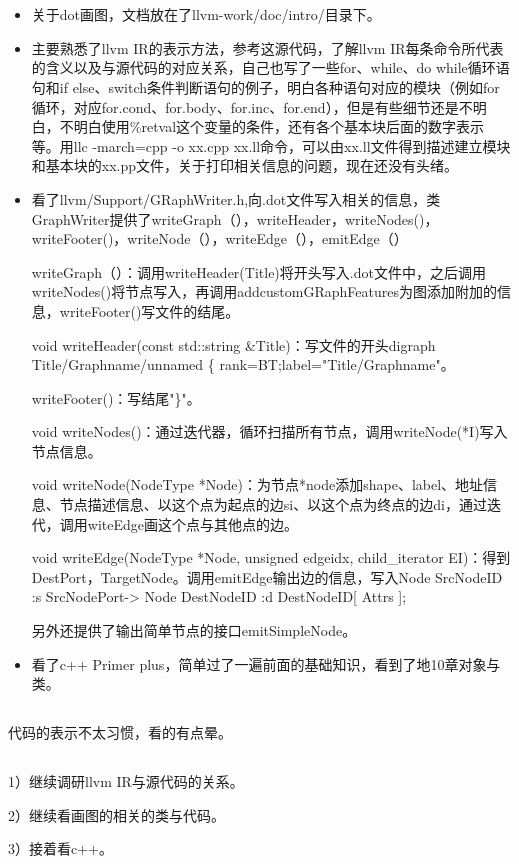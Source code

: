\section{}

\subsection{}

\begin{itemize}

\item{关于dot画图，文档放在了llvm-work/doc/intro/目录下。}

\item{主要熟悉了llvm IR的表示方法，参考这源代码，了解llvm IR每条命令所代表的含义以及与源代码的对应关系，自己也写了一些for、while、do while循环语句和if else、switch条件判断语句的例子，明白各种语句对应的模块（例如for循环，对应for.cond、for.body、for.inc、for.end），但是有些细节还是不明白，不明白使用\%retval这个变量的条件，还有各个基本块后面的数字表示等。用llc -march=cpp -o xx.cpp xx.ll命令，可以由xx.ll文件得到描述建立模块和基本块的xx.pp文件，关于打印相关信息的问题，现在还没有头绪。}

\item{看了llvm/Support/GRaphWriter.h,向.dot文件写入相关的信息，类GraphWriter提供了writeGraph（），writeHeader，writeNodes()，writeFooter()，writeNode（），writeEdge（），emitEdge（）

writeGraph（）：调用writeHeader(Title)将开头写入.dot文件中，之后调用writeNodes()将节点写入，再调用addcustomGRaphFeatures为图添加附加的信息，writeFooter()写文件的结尾。

void writeHeader(const std::string \&Title)：写文件的开头digraph Title/Graphname/unnamed \{ rank=BT;label="Title/Graphname"。

writeFooter()：写结尾"\}"。

void writeNodes()：通过迭代器，循环扫描所有节点，调用writeNode(*I)写入节点信息。

void writeNode(NodeType *Node)：为节点*node添加shape、label、地址信息、节点描述信息、以这个点为起点的边si、以这个点为终点的边di，通过迭代，调用witeEdge画这个点与其他点的边。

void writeEdge(NodeType *Node, unsigned edgeidx, child\_iterator EI)：得到DestPort，TargetNode。调用emitEdge输出边的信息，写入Node SrcNodeID :s SrcNodePort-> Node DestNodeID :d DestNodeID[ Attrs ];

另外还提供了输出简单节点的接口emitSimpleNode。
 
}
\item{看了c++ Primer plus，简单过了一遍前面的基础知识，看到了地10章对象与类。}
\end{itemize}

\subsection{}
代码的表示不太习惯，看的有点晕。

\subsection{}
1）继续调研llvm IR与源代码的关系。

2）继续看画图的相关的类与代码。

3）接着看c++。

